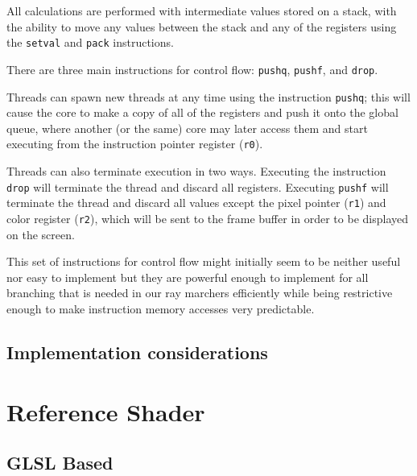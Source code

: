 		All calculations are performed with intermediate values stored on a
		stack, with the ability to move any values between the stack and any of
		the registers using the \texttt{setval} and \texttt{pack} instructions.

		There are three main instructions for control flow: \texttt{pushq},
		\texttt{pushf}, and \texttt{drop}. 
		
		Threads can spawn new threads at any time using the instruction
		\texttt{pushq}; this will cause the core to make a copy of all of the
		registers and push it onto the global queue, where another (or the
		same) core may later access them and start executing from the
		instruction pointer register (\texttt{r0}).
		
		Threads can also terminate execution in two ways. Executing the
		instruction \texttt{drop} will terminate the thread and discard all
		registers. Executing \texttt{pushf} will terminate the thread and
		discard all values except the pixel pointer (\texttt{r1}) and color
		register (\texttt{r2}), which will be sent to the frame buffer in order 
		to be displayed on the screen.

		This set of instructions for control flow might initially seem to be
		neither useful nor easy to implement but they are powerful enough to
		implement for all branching that is needed in our ray marchers 
		efficiently while being restrictive enough to make instruction memory 
		accesses very predictable.
	
	\subsection{Implementation considerations}

\section{Reference Shader}

	\subsection{GLSL Based}

	\subsection{}
